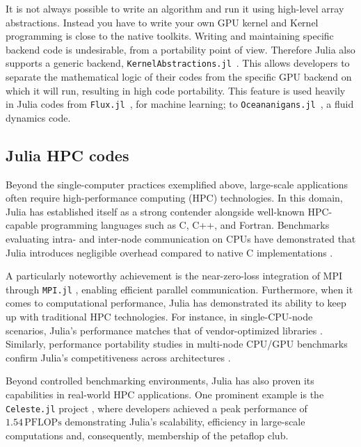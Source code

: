 \documentclass{webofc}
\begin{document}
It is not always possible to write an algorithm and run it using high-level
array abstractions. Instead you have to write your own GPU kernel and Kernel
programming is close to the native toolkits.  Writing and maintaining specific
backend code is undesirable, from a portability point of view. Therefore Julia
also supports a generic backend,
\texttt{KernelAbstractions.jl}~\cite{BESARD201929,8471188}. This allows
developers to separate the mathematical logic of their codes from the specific
GPU backend on which it will run, resulting in high code portability. This
feature is used heavily in Julia codes from \texttt{Flux.jl}~\cite{innes:2018},
for machine learning; to
\texttt{Oceananigans.jl}~\cite{Ramadhan_Oceananigans_jl_Fast_and_2020}, a fluid
dynamics code.

\subsection{Julia HPC codes}
Beyond the single-computer practices exemplified above, large-scale applications often require high-performance computing (HPC) technologies. In this domain, Julia has established itself as a strong contender alongside well-known HPC-capable programming languages such as C, C++, and Fortran. Benchmarks evaluating intra- and inter-node communication on CPUs have demonstrated that Julia introduces negligible overhead compared to native C implementations \cite{hunold2020benchmarking}. 

A particularly noteworthy achievement is the near-zero-loss integration of MPI through \texttt{MPI.jl} \cite{byrne2021mpi}, enabling efficient parallel communication. Furthermore, when it comes to computational performance, Julia has demonstrated its ability to keep up with traditional HPC technologies. For instance, in single-CPU-node scenarios, Julia's performance matches that of vendor-optimized libraries \cite{giordano2022productivity}. Similarly, performance portability studies in multi-node CPU/GPU benchmarks confirm Julia's competitiveness across architectures \cite{teichgraber2022julia,godoy2023evaluating}.

Beyond controlled benchmarking environments, Julia has also proven its capabilities in real-world HPC applications. One prominent example is the \texttt{Celeste.jl} project \cite{RiegerIEEE:2018,RiegerAAS:2019}, where developers achieved a peak performance of \(1.54\,\mathrm{PFLOPs}\) demonstrating Julia's scalability, efficiency in large-scale computations and, consequently, membership of the petaflop club.
\end{document}
